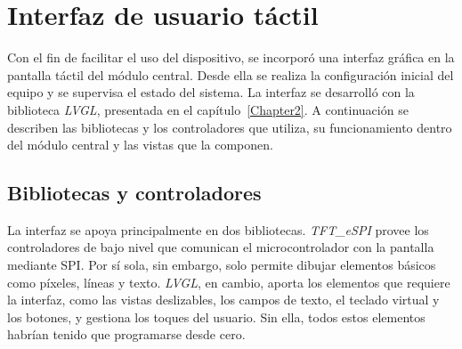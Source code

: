 


\section{Interfaz de usuario táctil}

Con el fin de facilitar el uso del dispositivo, se incorporó una interfaz gráfica en la pantalla táctil del módulo central. Desde ella se realiza la configuración inicial del equipo y se supervisa el estado del sistema. La interfaz se desarrolló con la biblioteca \emph{LVGL}, presentada en el capítulo~\ref{Chapter2}. A continuación se describen las bibliotecas y los controladores que utiliza, su funcionamiento dentro del módulo central y las vistas que la componen.

\subsection{Bibliotecas y controladores}

La interfaz se apoya principalmente en dos bibliotecas. \emph{TFT\_eSPI} provee los controladores de bajo nivel que comunican el microcontrolador con la pantalla mediante SPI. Por sí sola, sin embargo, solo permite dibujar elementos básicos como píxeles, líneas y texto. \emph{LVGL}, en cambio, aporta los elementos que requiere la interfaz, como las vistas deslizables, los campos de texto, el teclado virtual y los botones, y gestiona los toques del usuario. Sin ella, todos estos elementos habrían tenido que programarse desde cero.

